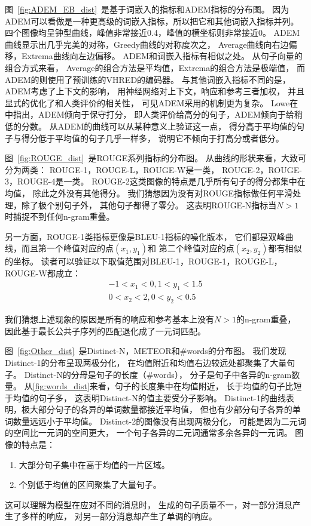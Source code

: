 
图~\ref{fig:ADEM_EB_dist}~是基于词嵌入的指标和ADEM指标的分布图。
因为ADEM可以看做是一种更高级的词嵌入指标，所以把它和其他词嵌入指标并列。
四个图像均呈钟型曲线，峰值非常接近0.4，峰值的横坐标则非常接近0。
ADEM曲线显示出几乎完美的对称，Greedy曲线的对称度次之，
Average曲线向右边偏移，Extrema曲线向左边偏移。
ADEM和词嵌入指标有相似之处。
从句子向量的组合方式来看，
Average的组合方法是平均值，Extrema的组合方法是极端值，
而ADEM的则使用了预训练的VHRED的编码器。
与其他词嵌入指标不同的是，ADEM考虑了上下文的影响，
用神经网络对上下文，响应和参考三者加权，
并且显式的优化了和人类评价的相关性，
可见ADEM采用的机制更为复杂。
Lowe在\cite{ADEM}中指出，ADEM倾向于保守打分，
即人类评价给高分的句子，ADEM倾向于给稍低的分数。
从ADEM的曲线可以从某种意义上验证这一点，
得分高于平均值的句子与得分低于平均值的句子几乎一样多，
说明它不倾向于打高分或者低分。


图~\ref{fig:ROUGE_dist}~是ROUGE系列指标的分布图。
从曲线的形状来看，大致可分为两类：
ROUGE-1，ROUGE-L，ROUGE-W是一类，
ROUGE-2，ROUGE-3，ROUGE-4是一类。
ROUGE-2这类图像的特点是几乎所有句子的得分都集中在均值，
除此之外没有其他得分。
我们猜想因为没有对ROUGE指标做任何平滑处理，除了极个别句子外，
其他句子都得了零分。
这表明ROUGE-N指标当$N > 1$时捕捉不到任何n-gram重叠。

另一方面，ROUGE-1类指标更像是BLEU-1指标的噪化版本，
它们都是双峰曲线，而且第一个峰值对应的点$(x_1, y_1)$和
第二个峰值对应的点$(x_2, y_2)$都有相似的坐标。
读者可以验证以下取值范围对BLEU-1，ROUGE-1，ROUGE-L，ROUGE-W都成立：
\begin{align}
    -1 < x_1 < 0, 1 < y_1 < 1.5 \\
    0 < x_2 < 2, 0 < y_2 < 0.5
\end{align}

我们猜想上述现象的原因是所有的响应和参考基本上没有$N > 1$的n-gram重叠，
因此基于最长公共子序列的匹配退化成了一元词匹配。


图~\ref{fig:Other_dist}~是Distinct-N，METEOR和\#words的分布图。
我们发现Distinct-1的分布呈现两极分化，
在均值附近和均值右边较远处都聚集了大量句子。
Distinct-N的分母是句子的长度（\#words），
分子是句子中各异的n-gram数量。
从\ref{fig:words_dist}来看，句子的长度集中在均值附近，
长于均值的句子比短于均值的句子多，
这表明Distinct-N的值主要受分子影响。
Distinct-1的曲线表明，极大部分句子的各异的单词数量都接近平均值，
但也有少部分句子各异的单词数量远远小于平均值。
Distinct-2的图像没有出现两极分化，
可能是因为二元词的空间比一元词的空间更大，
一个句子各异的二元词通常多余各异的一元词。
图像的特点是：
\begin{enumerate}
    \item 大部分句子集中在高于均值的一片区域。
    \item 个别低于均值的区间聚集了大量句子。
\end{enumerate}
这可以理解为模型在应对不同的消息时，
生成的句子质量不一，对一部分消息产生了多样的响应，
对另一部分消息却产生了单调的响应。

